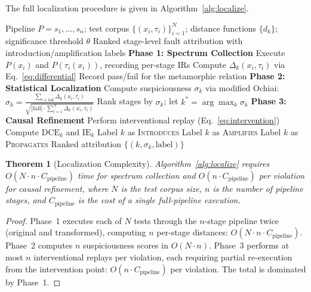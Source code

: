 \documentclass[sigconf,nonacm]{acmart}
\newtheorem{theorem}{Theorem}
\begin{document}
The full localization procedure is given in Algorithm~\ref{alg:localize}.

\begin{algorithm}[t]
\caption{Causal-Differential Fault Localization}
\label{alg:localize}
\begin{algorithmic}[1]
\REQUIRE Pipeline $P = s_1, \ldots, s_n$; test corpus $\{(x_i, \tau_i)\}_{i=1}^{N}$; distance functions $\{d_k\}$; significance threshold $\theta$
\ENSURE Ranked stage-level fault attribution with introduction/amplification labels
\STATE \textbf{Phase 1: Spectrum Collection}
    \STATE Execute $P(x_i)$ and $P(\tau_i(x_i))$, recording per-stage IRs
        \STATE Compute $\Delta_k(x_i, \tau_i)$ via Eq.~\eqref{eq:differential}
    \ENDFOR
    \STATE Record pass/fail for the metamorphic relation
\ENDFOR
\STATE \textbf{Phase 2: Statistical Localization}
    \STATE Compute suspiciousness $\sigma_k$ via modified Ochiai:
    \STATE \quad $\sigma_k = \frac{\sum_{i \in \mathrm{fail}} \Delta_k(x_i, \tau_i)}{\sqrt{|\mathrm{fail}| \cdot \sum_{i=1}^{N} \Delta_k(x_i, \tau_i)}}$
\ENDFOR
\STATE Rank stages by $\sigma_k$; let $k^* = \arg\max_k \sigma_k$
\STATE \textbf{Phase 3: Causal Refinement}
    \STATE Perform interventional replay (Eq.~\eqref{eq:intervention})
    \STATE Compute $\mathrm{DCE}_k$ and $\mathrm{IE}_k$
        \STATE Label $k$ as \textsc{Introduces}
        \STATE Label $k$ as \textsc{Amplifies}
    \ELSE
        \STATE Label $k$ as \textsc{Propagates}
    \ENDIF
\ENDFOR
\RETURN Ranked attribution $\{(k, \sigma_k, \text{label})\}$
\end{algorithmic}
\end{algorithm}

\begin{theorem}[Localization Complexity]\label{thm:complexity}
Algorithm~\ref{alg:localize} requires $O(N \cdot n \cdot C_{\mathrm{pipeline}})$ time for spectrum collection and $O(n \cdot C_{\mathrm{pipeline}})$ per violation for causal refinement, where $N$ is the test corpus size, $n$ is the number of pipeline stages, and $C_{\mathrm{pipeline}}$ is the cost of a single full-pipeline execution.
\end{theorem}

\begin{proof}
Phase~1 executes each of $N$ tests through the $n$-stage pipeline twice (original and transformed), computing $n$ per-stage distances: $O(N \cdot n \cdot C_{\mathrm{pipeline}})$.
Phase~2 computes $n$ suspiciousness scores in $O(N \cdot n)$.
Phase~3 performs at most $n$ interventional replays per violation, each requiring partial re-execution from the intervention point: $O(n \cdot C_{\mathrm{pipeline}})$ per violation.
The total is dominated by Phase~1.
\end{proof}
\end{document}
